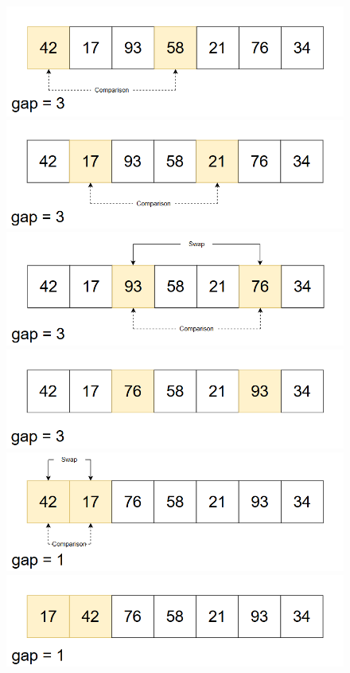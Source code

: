 \begin{figure}[H]
    \centering
    \includegraphics[width=0.5\linewidth]{img/shell_sort/2.png}
    \vspace{0.15cm}

    \includegraphics[width=0.5\linewidth]{img/shell_sort/3.png}
    \vspace{0.15cm}

    \includegraphics[width=0.5\linewidth]{img/shell_sort/4.png}
    \vspace{0.15cm}

    \includegraphics[width=0.5\linewidth]{img/shell_sort/5.png}
    \vspace{0.15cm}

    \includegraphics[width=0.5\linewidth]{img/shell_sort/6.png}
    \vspace{0.15cm}

    \includegraphics[width=0.5\linewidth]{img/shell_sort/7.png}
    \vspace{0.15cm}


\end{figure}
